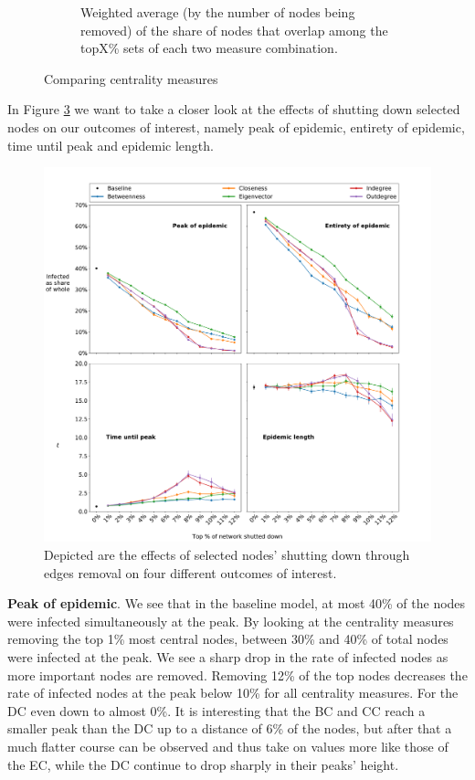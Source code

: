 \documentclass{Template_resources/netsci-project}
\begin{document}
\begin{figure}[!h]
\begin{subfigure}[t]{0.5\textwidth}
        \caption{\raggedleft Weighted average (by the number of nodes being removed) of the share of nodes that overlap among the topX\% sets of each two measure combination.}
        \label{fig:node_remove_overlap_matrix}
    \end{subfigure}
    \caption{Comparing centrality measures}
    \label{fig:measure_comparison}
\end{figure}


In Figure \ref{fig:interest_outcomes} we want to take a closer look at the effects of shutting down selected nodes on our outcomes of interest, namely peak of epidemic, entirety of epidemic, time until peak and epidemic length.
\begin{figure}[!h]
    \centering
    \includegraphics[width=\linewidth]{Figures/interest_outcomes.pdf}
    \caption{Depicted are the effects of selected nodes' shutting down through edges removal on four different outcomes of interest.}
    \label{fig:interest_outcomes}
\end{figure}

\textbf{Peak of epidemic}. We see that in the baseline model, at most 40\% of the nodes were infected simultaneously at the peak. By looking at the centrality measures removing the top 1\% most central nodes, between 30\% and 40\%  of total nodes were infected at the peak. We see a sharp drop in the rate of infected nodes as more important nodes are removed. Removing 12\%  of the top nodes decreases the rate of infected nodes at the peak below 10\%  for all centrality measures. For the DC even down to almost 0\%. It is interesting that the BC and CC reach a smaller peak than the DC up to a distance of 6\% of the nodes, but after that a much flatter course can be observed and thus take on values more like those of the EC, while the DC continue to drop sharply in their peaks' height.
\end{document}
